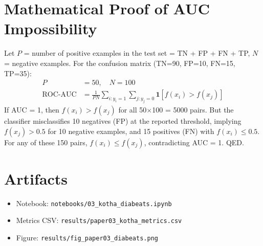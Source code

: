 \documentclass[12pt,a4paper]{article}
\begin{document}
\appendix
\section{Mathematical Proof of AUC Impossibility}
Let $P$ = number of positive examples in the test set = TN + FP + FN + TP, $N$ = negative examples. For the confusion matrix (TN=90, FP=10, FN=15, TP=35):
\begin{align}
  P &= 50,\quad N = 100 \\
  \text{ROC-AUC} &= \frac{1}{PN}\sum_{i: y_i=1}\sum_{j: y_j=0} \mathbf{1}[f(x_i) > f(x_j)]
\end{align}
If AUC = 1, then $f(x_i) > f(x_j)$ for all 50$\times$100 = 5000 pairs. But the classifier misclassifies 10 negatives (FP) at the reported threshold, implying $f(x_j) > 0.5$ for 10 negative examples, and 15 positives (FN) with $f(x_i) \leq 0.5$. For any of these 150 pairs, $f(x_i) \leq f(x_j)$, contradicting AUC = 1. QED.

\section{Artifacts}
\begin{itemize}
  \item Notebook: \texttt{notebooks/03\_kotha\_diabeats.ipynb}
  \item Metrics CSV: \texttt{results/paper03\_kotha\_metrics.csv}
  \item Figure: \texttt{results/fig\_paper03\_diabeats.png}
\end{itemize}
\end{document}
